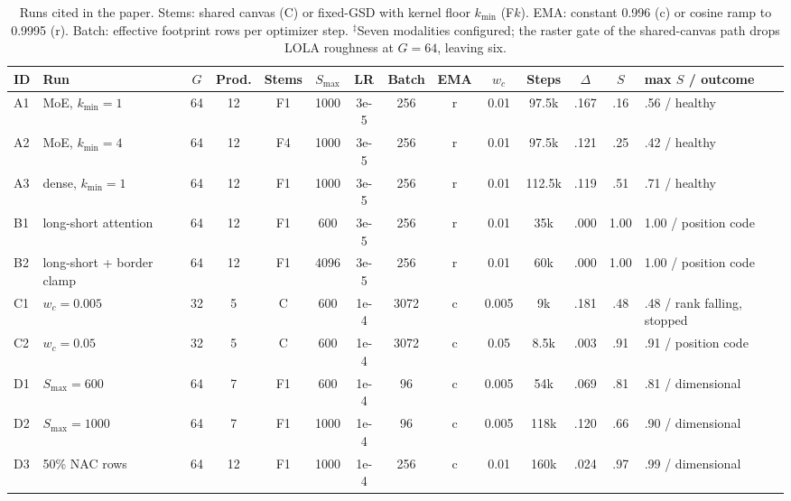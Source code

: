 \begin{table}[t]
  \centering
  \scriptsize
  \setlength{\tabcolsep}{3pt}
  \caption{Runs cited in the paper. Stems: shared canvas (C) or fixed-GSD with kernel floor $k_{\min}$ (F$k$). EMA: constant 0.996 (c) or cosine ramp to 0.9995 (r). Batch: effective footprint rows per optimizer step. $^\ddagger$Seven modalities configured; the raster gate of the shared-canvas path drops LOLA roughness at $G{=}64$, leaving six.}
  \label{tab:supp_runs}
  \begin{tabular}{@{}llcccccccccccl@{}}
    \toprule
    ID & Run & $G$ & Prod. & Stems & $S_{\max}$ & LR & Batch & EMA & $w_c$ & Steps & $\Delta$ & $S$ & max $S$ / outcome \\
    \midrule
    A1 & MoE, $k_{\min}{=}1$                                 & 64  & 12 & F1 & 1000 & 3e-5 & 256  & r & 0.01  & 97.5k  & .167 & .16  & .56 / healthy \\
    A2 & MoE, $k_{\min}{=}4$                                 & 64  & 12 & F4 & 1000 & 3e-5 & 256  & r & 0.01  & 97.5k  & .121 & .25  & .42 / healthy \\
    A3 & dense, $k_{\min}{=}1$                               & 64  & 12 & F1 & 1000 & 3e-5 & 256  & r & 0.01  & 112.5k & .119 & .51  & .71 / healthy \\
    B1 & long-short attention                                & 64  & 12 & F1 & 600  & 3e-5 & 256  & r & 0.01  & 35k    & .000 & 1.00 & 1.00 / position code \\
    B2 & long-short + border clamp                           & 64  & 12 & F1 & 4096 & 3e-5 & 256  & r & 0.01  & 60k    & .000 & 1.00 & 1.00 / position code \\
    C1 & $w_c{=}0.005$                                       & 32  & 5  & C  & 600  & 1e-4 & 3072 & c & 0.005 & 9k     & .181 & .48  & .48 / rank falling, stopped \\
    C2 & $w_c{=}0.05$                                        & 32  & 5  & C  & 600  & 1e-4 & 3072 & c & 0.05  & 8.5k   & .003 & .91  & .91 / position code \\
    D1 & $S_{\max}{=}600$                                    & 64  & 7  & F1 & 600  & 1e-4 & 96   & c & 0.005 & 54k    & .069 & .81  & .81 / dimensional \\
    D2 & $S_{\max}{=}1000$                                   & 64  & 7  & F1 & 1000 & 1e-4 & 96   & c & 0.005 & 118k   & .120 & .66  & .90 / dimensional \\
    D3 & 50\% NAC rows                                       & 64  & 12 & F1 & 1000 & 1e-4 & 256  & c & 0.01  & 160k   & .024 & .97  & .99 / dimensional \\

\end{tabular}
\end{table}
